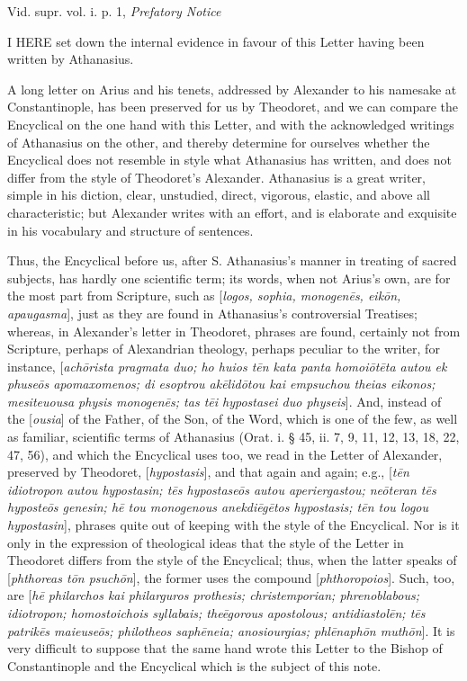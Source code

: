 
Vid.
supr. vol. i. p. 1, \emph{Prefatory Notice}

I HERE set
down the internal evidence in favour of this Letter having been
written by Athanasius.

A long letter on Arius and his tenets, addressed
by Alexander to his namesake at Constantinople, has been preserved for
us by Theodoret, and we can compare the Encyclical on the one hand
with this Letter, and with the acknowledged writings of Athanasius on
the other, and thereby determine for ourselves whether the Encyclical
does not resemble in style what Athanasius has written, and does not
differ from the style of Theodoret's Alexander. Athanasius is a great
writer, simple in his diction, clear, unstudied, direct, vigorous,
elastic, and above all characteristic; but Alexander writes with an
effort, and is elaborate and exquisite in his vocabulary and structure
of sentences.

Thus, the Encyclical before us, after S.
Athanasius's manner in treating of sacred subjects, has hardly one
scientific term; its words, when not Arius's own, are for the most
part from Scripture, such as [\emph{logos, sophia, monogen\={e}s, eik\={o}n,
apaugasma}], just as they are found in Athanasius's controversial
Treatises; whereas, in Alexander's letter in Theodoret, phrases are
found, certainly not from Scripture, perhaps of Alexandrian theology,
perhaps peculiar to the writer, for instance, [\emph{ach\={o}rista
pragmata duo; ho huios t\={e}n kata panta homoi\={o}t\={e}ta
autou ek phuse\={o}s apomaxomenos; di esoptrou ak\={e}lid\={o}tou
kai empsuchou theias eikonos; mesiteuousa physis monogen\={e}s; tas
t\={e}i hypostasei duo physeis}]. And, instead of the [\emph{ousia}]
of the Father, of the Son, of the Word, which is one of the few, as
well as familiar, scientific terms of Athanasius (Orat. i. § 45, ii.
7, 9, 11, 12, 13, 18, 22, 47, 56), and which the Encyclical uses too,
we read in the Letter of Alexander, preserved by Theodoret, [\emph{hypostasis}],
and that again and again; e.g., [\emph{t\={e}n idiotropon autou
hypostasin; t\={e}s hypostase\={o}s autou aperiergastou; ne\={o}teran
t\={e}s hyposte\={o}s genesin; h\={e} tou monogenous anekdi\={e}g\={e}tos
hypostasis; t\={e}n tou logou hypostasin}], phrases quite out of
keeping with the style of the Encyclical. Nor is it only in the
expression of theological ideas that the style of the Letter in
Theodoret differs from the style of the Encyclical; thus, when the
latter speaks of [\emph{phthoreas t\={o}n psuch\={o}n}], the
former uses the compound [\emph{phthoropoios}]. Such, too, are [\emph{h\={e}
philarchos kai philarguros prothesis; christemporian; phrenoblabous;
idiotropon; homostoichois syllabais; the\={e}gorous apostolous;
antidiastol\={e}n; t\={e}s patrik\={e}s maieuse\={o}s;
philotheos saph\={e}neia; anosiourgias; phl\={e}naph\={o}n
muth\={o}n}]. It is very difficult to suppose that the same hand
wrote this Letter to the Bishop of Constantinople and the Encyclical
which is the subject of this note.

